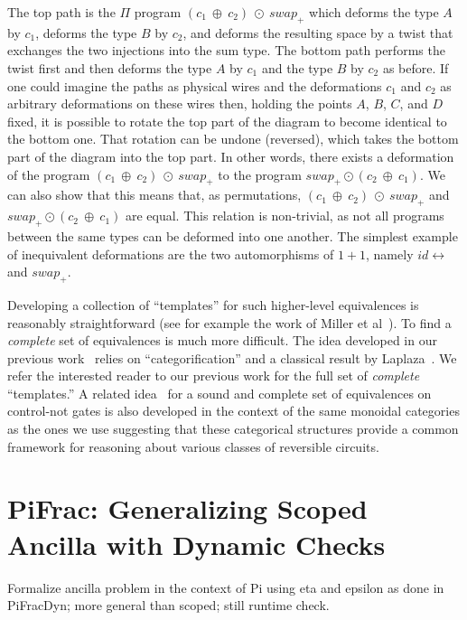 \documentclass[sigplan,10pt,review,anonymous]{acmart}
\newcommand{\swapp}{\mathit{swap}_+}
\newcommand{\idc}{\mathit{id}\!\!\leftrightarrow}
\begin{document}
\noindent The top path is the $\Pi$ program
$(c_1~\oplus~c_2)~\odot~\swapp$ which deforms the type $A$ by $c_1$,
deforms the type $B$ by $c_2$, and deforms the resulting space by a
twist that exchanges the two injections into the sum type. The bottom
path performs the twist first and then deforms the type $A$ by $c_1$
and the type $B$ by $c_2$ as before. If one could imagine the paths
  as physical wires and the deformations $c_1$ and $c_2$ as arbitrary
deformations on these wires then, holding the points $A$, $B$, $C$,
and $D$ fixed, it is possible to rotate the top part of the diagram to
become identical to the bottom one. That rotation can be undone
(reversed), which takes the bottom part of the diagram into the top
part.  In other words, there exists a deformation of the program
$(c_1~\oplus~c_2)~\odot~\swapp$ to the program
$\swapp \odot (c_2~\oplus~c_1)$. We can also show that this means
that, as permutations, $(c_1~\oplus~c_2)~\odot~\swapp$ and
$\swapp \odot (c_2~\oplus~c_1)$ are equal. This relation is
non-trivial, as not all programs between the same types can be
deformed into one another. The simplest example of inequivalent
deformations are the two automorphisms of $1+1$, namely $\idc$ and
$\swapp$.

Developing a collection of ``templates'' for such higher-level
equivalences is reasonably straightforward (see for example the work
of Miller et al~\cite{Miller:2003:TBA:775832.775915}). To find a
\emph{complete} set of equivalences is much more difficult. The idea
developed in our previous work~\cite{DBLP:conf/esop/CaretteS16} relies
on ``categorification'' and a classical result by
Laplaza~\cite{laplaza}. We refer the interested reader to our previous
work for the full set of \emph{complete} ``templates.'' A related
idea~\cite{DBLP:journals/corr/CockettCS17} for a sound and complete
set of equivalences on control-not gates is also developed in the
context of the same monoidal categories as the ones we use suggesting
that these categorical structures provide a common framework for
reasoning about various classes of reversible circuits.

\section{PiFrac: Generalizing Scoped Ancilla with Dynamic Checks}

Formalize ancilla problem in the context of Pi using eta and epsilon
as done in PiFracDyn; more general than scoped; still runtime
check.
\end{document}
